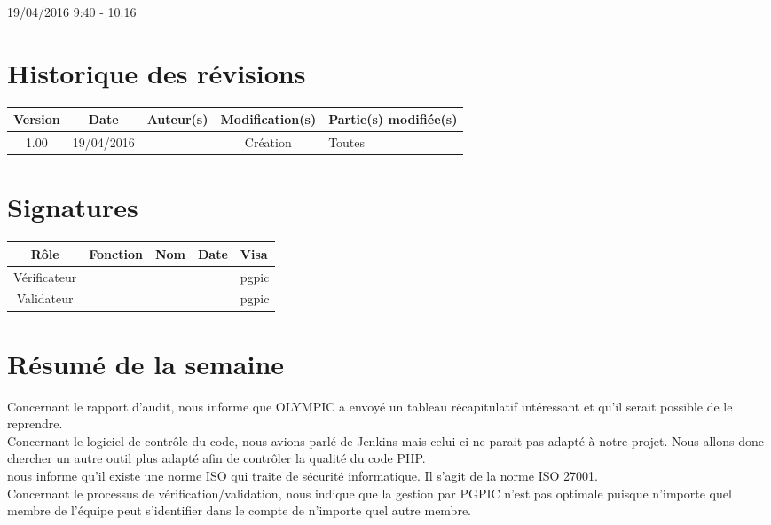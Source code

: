 \documentclass [a4paper] {article}
\begin{document}
\rhead{}

19/04/2016
\hfill   
\hfill 	9:40 - 10:16 				%



\section*{Historique des révisions}
\begin{center}
			\begin{tabular}{| c | c | c | c | p{4cm} |}
				\hline
				\rowcolor{Gray}
				Version & Date & Auteur(s) & Modification(s) & Partie(s) modifiée(s)		 \\
				\hline
				1.00 & 19/04/2016 & \Pierre & Création & Toutes \\
		\hline		
			\end{tabular}
		\end{center}

\section*{Signatures}

		\begin{center}
			\begin{tabular}{| c | c | c | c | p{4cm} |}
				\hline
				\rowcolor{Gray}
				Rôle & Fonction & Nom & Date & Visa		 \\
				\hline
				Vérificateur & \RQA & \Kafui &  & pgpic \\[30pt]
				\hline
				Validateur & \CP & \Sergi &  & pgpic \\[30pt]	
				\hline
			\end{tabular}
		\end{center}


\section{Résumé de la semaine}

Concernant le rapport d'audit, \nomTuteurQualite{} nous informe que OLYMPIC a envoyé un tableau récapitulatif intéressant et qu'il serait possible de le reprendre. \\
\indent
Concernant le logiciel de contrôle du code, nous avions parlé de Jenkins mais celui ci ne parait pas adapté à notre projet. Nous allons donc chercher un autre outil plus adapté afin de contrôler la qualité du code PHP. \\
\indent
\nomTuteurQualite{} nous informe qu'il existe une norme ISO qui traite de sécurité informatique. Il s'agit de la norme ISO 27001. \\
\indent
Concernant le processus de vérification/validation, \nomTuteurQualite{} nous indique que la gestion par PGPIC n'est pas optimale puisque n'importe quel membre de l'équipe peut s'identifier dans le compte de n'importe quel autre membre.
\end{document}
